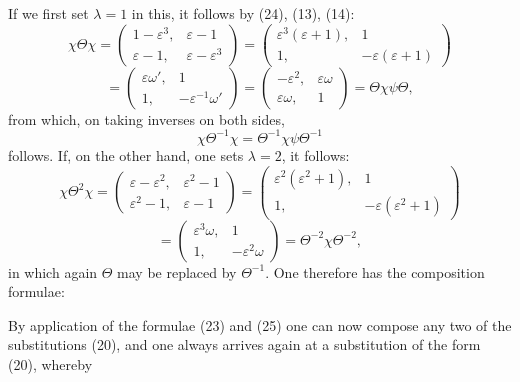If we first set $\lambda=1$ in this, it follows by (24), (13), (14):
\[
\chi\Theta\chi = \begin{pmatrix} 1-\varepsilon^3, & \varepsilon-1 \\ \varepsilon-1, & \varepsilon-\varepsilon^3 \end{pmatrix}
= \begin{pmatrix} \varepsilon^3(\varepsilon+1), & 1 \\ 1, & -\varepsilon(\varepsilon+1) \end{pmatrix}
\]
\[
= \begin{pmatrix} \varepsilon\omega', & 1 \\ 1, & -\varepsilon^{-1}\omega' \end{pmatrix}
= \begin{pmatrix} -\varepsilon^2, & \varepsilon\omega \\ \varepsilon\omega, & 1 \end{pmatrix}
= \Theta\chi\psi\Theta,
\]
from which, on taking inverses on both sides,
\[
\chi\Theta^{-1}\chi = \Theta^{-1}\chi\psi\Theta^{-1}
\]
follows. If, on the other hand, one sets $\lambda=2$, it follows:
\[
\chi\Theta^2\chi = \begin{pmatrix} \varepsilon-\varepsilon^2, & \varepsilon^2-1 \\ \varepsilon^2-1, & \varepsilon-1 \end{pmatrix}
= \begin{pmatrix} \varepsilon^2(\varepsilon^2+1), & 1 \\ 1, & -\varepsilon(\varepsilon^2+1) \end{pmatrix}
\]
\[
= \begin{pmatrix} \varepsilon^3\omega, & 1 \\ 1, & -\varepsilon^2\omega \end{pmatrix}
= \Theta^{-2}\chi\Theta^{-2},
\]
in which again $\Theta$ may be replaced by $\Theta^{-1}$. One therefore has the composition formulae:


By application of the formulae (23) and (25) one can now compose any two of the substitutions (20), and one always arrives again at a substitution of the form (20), whereby
